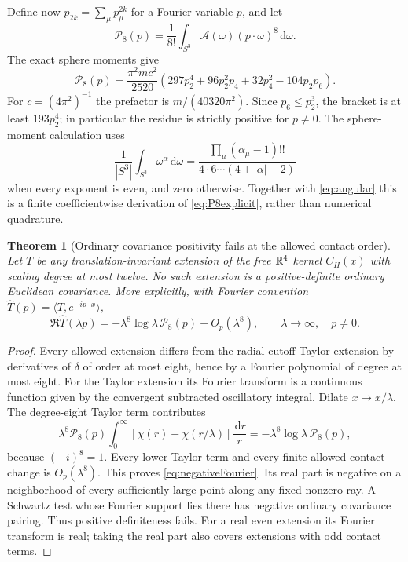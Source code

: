 \documentclass[11pt,letterpaper]{article}
\theoremstyle{plain}
\newtheorem{theorem}{Theorem}[section]
\theoremstyle{remark}\newtheorem{remark}[theorem]{Scope}
\newcommand{\dd}{\,\mathrm d}\newcommand{\OH}{\mathcal O_H}
\begin{document}
Define now $p_{2k}=\sum_\mu p_\mu^{2k}$ for a Fourier variable $p$, and let
\begin{equation}
\mathcal P_8(p)=\frac1{8!}\int_{S^3}\mathcal A(\omega)(p\cdot\omega)^8\dd\omega.
\label{eq:P8integral}
\end{equation}
The exact sphere moments give
\begin{equation}
\boxed{\mathcal P_8(p)=\frac{\pi^2mc^2}{2520}
\left(297p_2^4+96p_2^2p_4+32p_4^2-104p_2p_6\right).}
\label{eq:P8explicit}
\end{equation}
For $c=(4\pi^2)^{-1}$ the prefactor is $m/(40320\pi^2)$.
Since $p_6\le p_2^3$, the bracket is at least $193p_2^4$; in particular the
residue is strictly positive for $p\ne0$. The sphere-moment calculation uses
\[
\frac1{|S^3|}\int_{S^3}\omega^\alpha\dd\omega
=\frac{\prod_\mu(\alpha_\mu-1)!!}
{4\cdot6\cdots(4+|\alpha|-2)}
\]
when every exponent is even, and zero otherwise. Together with
\eqref{eq:angular} this is a finite coefficientwise derivation of
\eqref{eq:P8explicit}, rather than numerical quadrature.

\begin{theorem}[Ordinary covariance positivity fails at the allowed contact order]
\label{thm:positivity-obstruction}
Let $T$ be any translation-invariant extension of the free $\mathbb R^4$ kernel
$C_H(x)$ with scaling degree at most twelve. No such extension is a
positive-definite ordinary Euclidean covariance. More explicitly, with Fourier
convention $\widehat T(p)=\langle T,e^{-ip\cdot x}\rangle$,
\begin{equation}
\Re\widehat T(\lambda p)
=-\lambda^8\log\lambda\,\mathcal P_8(p)+O_p(\lambda^8),
\qquad\lambda\to\infty,\quad p\ne0.
\label{eq:negativeFourier}
\end{equation}
\end{theorem}
\begin{proof}
Every allowed extension differs from the radial-cutoff Taylor extension by
derivatives of $\delta$ of order at most eight, hence by a Fourier polynomial of
degree at most eight. For the Taylor extension its Fourier transform is a continuous
function given by the convergent subtracted oscillatory integral. Dilate
$x\mapsto x/\lambda$. The degree-eight Taylor term contributes
\[
\lambda^8\mathcal P_8(p)
\int_0^\infty[\chi(r)-\chi(r/\lambda)]\frac{\dd r}{r}
=-\lambda^8\log\lambda\,\mathcal P_8(p),
\]
because $(-i)^8=1$. Every lower Taylor term and every finite allowed contact
change is $O_p(\lambda^8)$. This proves \eqref{eq:negativeFourier}.
Its real part is negative on a neighborhood of every sufficiently large point
along any fixed nonzero ray. A Schwartz test whose Fourier support lies there
has negative ordinary covariance pairing. Thus positive definiteness fails.
For a real even extension its Fourier transform is real; taking the real part
also covers extensions with odd contact terms.
\end{proof}
\end{document}
